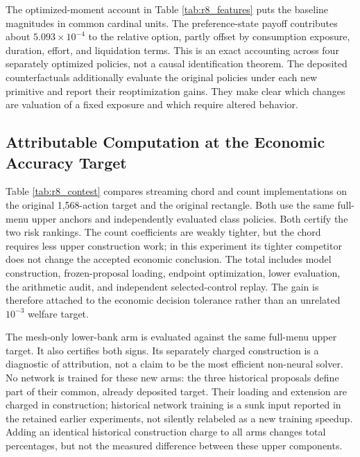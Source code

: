 
The optimized-moment account in Table \ref{tab:r8_features} puts the baseline magnitudes in common cardinal units. The preference-state payoff contributes about $5.093\times10^{-4}$ to the relative option, partly offset by consumption exposure, duration, effort, and liquidation terms. This is an exact accounting across four separately optimized policies, not a causal identification theorem. The deposited counterfactuals additionally evaluate the original policies under each new primitive and report their reoptimization gains. They make clear which changes are valuation of a fixed exposure and which require altered behavior.

\subsection{Attributable Computation at the Economic Accuracy Target}


Table \ref{tab:r8_contest} compares streaming chord and count implementations on the original 1,568-action target and the original rectangle. Both use the same full-menu upper anchors and independently evaluated class policies. Both certify the two risk rankings. The count coefficients are weakly tighter, but the chord requires less upper construction work; in this experiment its tighter competitor does not change the accepted economic conclusion. The total includes model construction, frozen-proposal loading, endpoint optimization, lower evaluation, the arithmetic audit, and independent selected-control replay. The gain is therefore attached to the economic decision tolerance rather than an unrelated $10^{-3}$ welfare target.

The mesh-only lower-bank arm is evaluated against the same full-menu upper target. It also certifies both signs. Its separately charged construction is a diagnostic of attribution, not a claim to be the most efficient non-neural solver. No network is trained for these new arms: the three historical proposals define part of their common, already deposited target. Their loading and extension are charged in construction; historical network training is a sunk input reported in the retained earlier experiments, not silently relabeled as a new training speedup. Adding an identical historical construction charge to all arms changes total percentages, but not the measured difference between these upper components.

